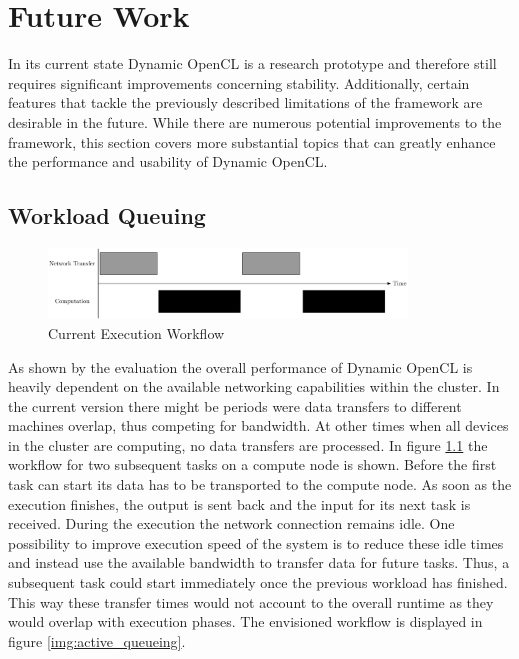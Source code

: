 \chapter{Future Work}

In its current state Dynamic OpenCL is a research prototype and therefore still requires significant improvements concerning stability. Additionally, certain features that tackle the previously described limitations of the framework are desirable in the future. While there are numerous potential improvements to the framework, this section covers more substantial topics that can greatly enhance the performance and usability of Dynamic OpenCL.

\section*{Workload Queuing}

\begin{figure}[!htb]	
	\includegraphics[width=0.85\textwidth]{drawings/missing_queue.pdf}
	\centering
	\caption{Current Execution Workflow}
	\label{img:missing_queuing}
\end{figure}
As shown by the evaluation the overall performance of Dynamic OpenCL is heavily dependent on the available networking capabilities within the cluster. In the current version there might be periods were data transfers to different machines overlap, thus competing for bandwidth. At other times when all devices in the cluster are computing, no data transfers are processed. In figure \ref{img:missing_queuing} the workflow for two subsequent tasks on a compute node is shown. Before the first task can start its data has to be transported to the compute node. As soon as the execution finishes, the output is sent back and the input for its next task is received. During the execution the network connection remains idle. One possibility to improve execution speed of the system is to reduce these idle times and instead use the available bandwidth to transfer data for future tasks. Thus, a subsequent task could start immediately once the previous workload has finished. This way these transfer times would not account to the overall runtime as they would overlap with execution phases. The envisioned workflow is displayed in figure \ref{img:active_queueing}.

